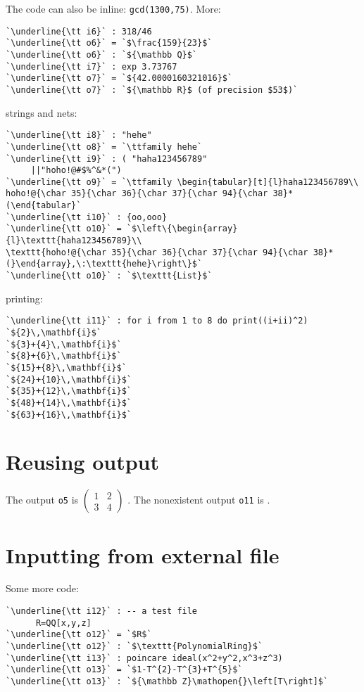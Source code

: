 \documentclass[12pt,a4paper]{amsart}
\begin{document}
The code can also be inline: \lstinline[language=Macaulay2]!gcd(1300,75)!.
More:
\begin{lstlisting}[language=Macaulay2output]
`\underline{\tt i6}` : 318/46
`\underline{\tt o6}` = `$\frac{159}{23}$`
`\underline{\tt o6}` : `${\mathbb Q}$`
`\underline{\tt i7}` : exp 3.73767
`\underline{\tt o7}` = `${42.0000160321016}$`
`\underline{\tt o7}` : `${\mathbb R}$ (of precision $53$)`
\end{lstlisting}
strings and nets:
\begin{lstlisting}[language=Macaulay2output]
`\underline{\tt i8}` : "hehe"
`\underline{\tt o8}` = `\ttfamily hehe`
`\underline{\tt i9}` : ( "haha123456789"
     ||"hoho!@#$%^&*(")
`\underline{\tt o9}` = `\ttfamily \begin{tabular}[t]{l}haha123456789\\
hoho!@{\char 35}{\char 36}{\char 37}{\char 94}{\char 38}*(\end{tabular}`
`\underline{\tt i10}` : {oo,ooo}
`\underline{\tt o10}` = `$\left\{\begin{array}{l}\texttt{haha123456789}\\
\texttt{hoho!@{\char 35}{\char 36}{\char 37}{\char 94}{\char 38}*(}\end{array},\:\texttt{hehe}\right\}$`
`\underline{\tt o10}` : `$\texttt{List}$`
\end{lstlisting}
printing:
\begin{lstlisting}[language=Macaulay2output]
`\underline{\tt i11}` : for i from 1 to 8 do print((i+ii)^2)
`${2}\,\mathbf{i}$`
`${3}+{4}\,\mathbf{i}$`
`${8}+{6}\,\mathbf{i}$`
`${15}+{8}\,\mathbf{i}$`
`${24}+{10}\,\mathbf{i}$`
`${35}+{12}\,\mathbf{i}$`
`${48}+{14}\,\mathbf{i}$`
`${63}+{16}\,\mathbf{i}$`
\end{lstlisting}

\section{Reusing output}
The output {\tt o5} is $\left(\!\begin{array}{cc}
1&2\\
3&4
\end{array}\!\right)$%
.
The nonexistent output {\tt o11} is %
.

\section{Inputting from external file}
Some more code:
\begin{lstlisting}[language=Macaulay2output]
`\underline{\tt i12}` : -- a test file
      R=QQ[x,y,z]
`\underline{\tt o12}` = `$R$`
`\underline{\tt o12}` : `$\texttt{PolynomialRing}$`
`\underline{\tt i13}` : poincare ideal(x^2+y^2,x^3+z^3)
`\underline{\tt o13}` = `$1-T^{2}-T^{3}+T^{5}$`
`\underline{\tt o13}` : `${\mathbb Z}\mathopen{}\left[T\right]$`
\end{lstlisting}
\end{document}

